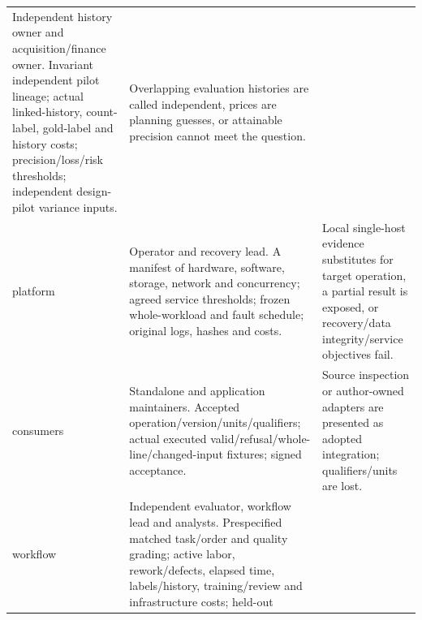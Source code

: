 \documentclass[
  11pt,
  a4paper,
]{article}
\begin{document}
\begin{longtable}[]{@{}lll@{}}
\begin{minipage}[t]{0.30\columnwidth}
Independent history owner and acquisition/finance owner. Invariant
independent pilot lineage; actual linked-history, count-label,
gold-label and history costs; precision/loss/risk thresholds;
independent design-pilot variance inputs.\strut
\end{minipage} & \begin{minipage}[t]{0.30\columnwidth}\raggedright
Overlapping evaluation histories are called independent, prices are
planning guesses, or attainable precision cannot meet the
question.\strut
\end{minipage}\tabularnewline
\begin{minipage}[t]{0.30\columnwidth}\raggedright
platform\strut
\end{minipage} & \begin{minipage}[t]{0.30\columnwidth}\raggedright
Operator and recovery lead. A manifest of hardware, software, storage,
network and concurrency; agreed service thresholds; frozen
whole-workload and fault schedule; original logs, hashes and
costs.\strut
\end{minipage} & \begin{minipage}[t]{0.30\columnwidth}\raggedright
Local single-host evidence substitutes for target operation, a partial
result is exposed, or recovery/data integrity/service objectives
fail.\strut
\end{minipage}\tabularnewline
\begin{minipage}[t]{0.30\columnwidth}\raggedright
consumers\strut
\end{minipage} & \begin{minipage}[t]{0.30\columnwidth}\raggedright
Standalone and application maintainers. Accepted
operation/version/units/qualifiers; actual executed
valid/refusal/whole-line/changed-input fixtures; signed
acceptance.\strut
\end{minipage} & \begin{minipage}[t]{0.30\columnwidth}\raggedright
Source inspection or author-owned adapters are presented as adopted
integration; qualifiers/units are lost.\strut
\end{minipage}\tabularnewline
\begin{minipage}[t]{0.30\columnwidth}\raggedright
workflow\strut
\end{minipage} & \begin{minipage}[t]{0.30\columnwidth}\raggedright
Independent evaluator, workflow lead and analysts. Prespecified matched
task/order and quality grading; active labor, rework/defects, elapsed
time, labels/history, training/review and infrastructure costs; held-out

\end{minipage}
\end{longtable}
\end{document}
